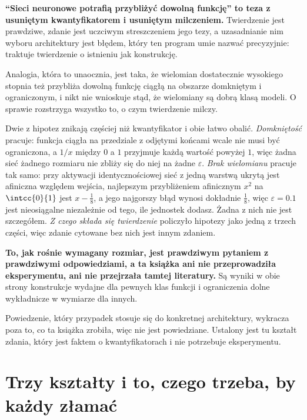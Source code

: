 \begin{fr}
\begin{trapbox}
\textbf{\enquote{Sieci neuronowe potrafią przybliżyć dowolną funkcję} to teza
z usuniętym kwantyfikatorem i usuniętym milczeniem.} Twierdzenie jest
prawdziwe, zdanie jest uczciwym streszczeniem jego tezy, a uzasadnianie nim
wyboru architektury jest błędem, który ten program umie nazwać precyzyjnie:
traktuje twierdzenie o istnieniu jak konstrukcję.

Analogia, która to unaocznia, jest taka, że wielomian dostatecznie wysokiego
stopnia też przybliża dowolną funkcję ciągłą na obszarze domkniętym i
ograniczonym, i nikt
nie wnioskuje stąd, że wielomiany są dobrą klasą modeli. O sprawie
rozstrzyga wszystko to, o czym twierdzenie milczy.
\end{trapbox}

Dwie z hipotez znikają częściej niż kwantyfikator i obie łatwo obalić.
\emph{Domkniętość} pracuje: funkcja ciągła na przedziale z odjętymi końcami
wcale nie musi być ograniczona, a $1/x$ między $0$ a $1$ przyjmuje każdą
wartość powyżej $1$, więc żadna sieć żadnego rozmiaru nie zbliży się do niej
na żadne $\varepsilon$. \emph{Brak wielomianu} pracuje tak samo: przy
aktywacji identycznościowej sieć z jedną warstwą ukrytą jest afiniczna
względem wejścia, najlepszym przybliżeniem afinicznym $x^{2}$ na
$\intcc{0}{1}$ jest $x - \frac{1}{8}$, a jego najgorszy błąd wynosi dokładnie
$\frac{1}{8}$, więc $\varepsilon = \num{0.1}$ jest nieosiągalne niezależnie od
tego, ile jednostek dodasz. Żadna z nich nie jest szczegółem.
\emph{Z czego składa się twierdzenie} policzyło hipotezy jako jedną z trzech
części, więc zdanie cytowane bez nich jest innym zdaniem.

\textbf{To, jak rośnie wymagany rozmiar, jest prawdziwym pytaniem z
prawdziwymi odpowiedziami, a ta książka ani nie przeprowadziła
eksperymentu, ani nie przejrzała tamtej literatury.} Są wyniki w obie strony
\dash{} konstrukcje wydajne dla pewnych klas funkcji i ograniczenia dolne
wykładnicze w wymiarze dla innych.

Powiedzenie, który przypadek stosuje się do konkretnej architektury, wykracza
poza to, co ta książka zrobiła, więc nie jest powiedziane. Ustalony jest tu
kształt zdania, który jest faktem o kwantyfikatorach i nie potrzebuje
eksperymentu.
\end{fr}

\section{Trzy kształty i to, czego trzeba, by każdy złamać}
\label{sec:P14-shapes}

